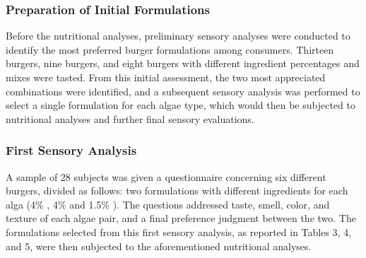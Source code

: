 \subsubsection{Preparation of Initial Formulations}
Before the nutritional analyses, preliminary sensory analyses were conducted to identify the most preferred burger formulations among consumers. Thirteen  burgers, nine  burgers, and eight  burgers with different ingredient percentages and mixes were tasted. From this initial assessment, the two most appreciated combinations were identified, and a subsequent sensory analysis was performed to select a single formulation for each algae type, which would then be subjected to nutritional analyses and further final sensory evaluations.

\subsubsection{First Sensory Analysis}
A sample of \num{28} subjects was given a questionnaire concerning six different burgers, divided as follows: two formulations with different ingredients for each alga (\num{4}\% , \num{4}\%  and \num{1.5}\% ). The questions addressed taste, smell, color, and texture of each algae pair, and a final preference judgment between the two.
The formulations selected from this first sensory analysis, as reported in Tables 3, 4, and 5, were then subjected to the aforementioned nutritional analyses.


